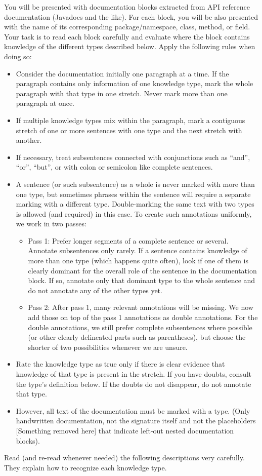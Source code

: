 \begin{shaded}
You will be presented with documentation blocks extracted from API reference documentation (Javadocs and the like). For each block, you will be also presented with the name of its corresponding package/namespace, class, method, or field. Your task is to read each block carefully and evaluate where the block contains knowledge of the different types described below. Apply the following rules when doing so:
\begin{itemize}
\item Consider the documentation initially one paragraph at a time. If the paragraph contains only information of one knowledge type, mark the whole paragraph with that type in one stretch.
Never mark more than one paragraph at once.
\item If multiple knowledge types mix within the paragraph, mark a contiguous stretch of one or more sentences with one type and the next stretch with another.
\item If necessary, treat subsentences connected with conjunctions such as "`and"', "`or"', "`but"', or with colon or semicolon like complete sentences.
\item A sentence (or such subsentence) as a whole is never marked with more than one type, but sometimes phrases within the sentence will require a separate marking with a different type. Double-marking the same text with two types is allowed (and required) in this case. To create such annotations uniformly, we work in two passes:
\begin{itemize}
\item Pass 1: Prefer longer segments of a complete sentence or several. Annotate subsentences only rarely.
If a sentence contains knowledge of more than one type (which happens quite often), look if one of them is clearly dominant for the overall role of the sentence in the documentation block. If so, annotate only that dominant type to the whole sentence and do not annotate any of the other types yet.
\item Pass 2: After pass 1, many relevant annotations will be missing. We now add those on top of the pass 1 annotations as double annotations. For the double annotations, we still prefer complete subsentences where possible (or other clearly delineated parts such as parentheses), but choose the shorter of two possibilities whenever we are unsure.
\end{itemize}
\item Rate the knowledge type as true only if there is clear evidence that knowledge of that type is present in the stretch.
If you have doubts, consult the type's definition below.
If the doubts do not disappear, do not annotate that type.
\item However, all text of the documentation must be marked with a type. (Only handwritten documentation, not the signature itself and not the placeholders [Something removed here] that indicate left-out nested documentation blocks).
\end{itemize}
Read (and re-read whenever needed) the following descriptions very carefully. They explain how to recognize each knowledge type.
\end{shaded}